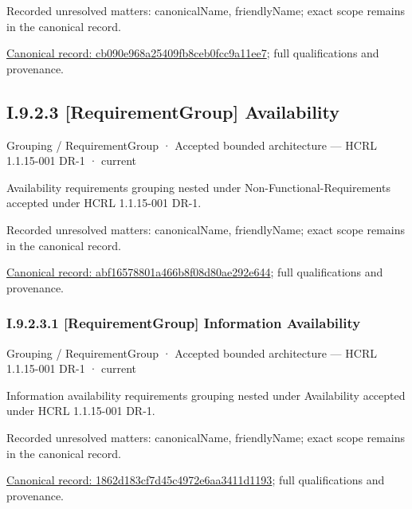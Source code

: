 {\small Recorded unresolved matters: canonicalName, friendlyName; exact scope remains in the canonical record.}\par
{\footnotesize \href{../../../../../../../continuum/grouping/requirement-group/cb090e968a25409fb8ceb0fcc9a11ee7.md}{Canonical record: cb090e968a25409fb8ceb0fcc9a11ee7}; full qualifications and provenance.}\par
\subsection*{I.9.2.3 [RequirementGroup] Availability}
\label{navigation:I.9.2.3}

\label{element:abf16578801a466b8f08d80ae292e644}
{\small Grouping / RequirementGroup · Accepted bounded architecture — HCRL 1.1.15-001 DR-1 · current}\par

Availability requirements grouping nested under Non-Functional-Requirements accepted under HCRL 1.1.15-001 DR-1.


{\small Recorded unresolved matters: canonicalName, friendlyName; exact scope remains in the canonical record.}\par
{\footnotesize \href{../../../../../../../continuum/grouping/requirement-group/abf16578801a466b8f08d80ae292e644.md}{Canonical record: abf16578801a466b8f08d80ae292e644}; full qualifications and provenance.}\par
\subsubsection*{I.9.2.3.1 [RequirementGroup] Information Availability}
\label{navigation:I.9.2.3.1}

\label{element:1862d183cf7d45c4972e6aa3411d1193}
{\small Grouping / RequirementGroup · Accepted bounded architecture — HCRL 1.1.15-001 DR-1 · current}\par

Information availability requirements grouping nested under Availability accepted under HCRL 1.1.15-001 DR-1.


{\small Recorded unresolved matters: canonicalName, friendlyName; exact scope remains in the canonical record.}\par
{\footnotesize \href{../../../../../../../continuum/grouping/requirement-group/1862d183cf7d45c4972e6aa3411d1193.md}{Canonical record: 1862d183cf7d45c4972e6aa3411d1193}; full qualifications and provenance.}\par
